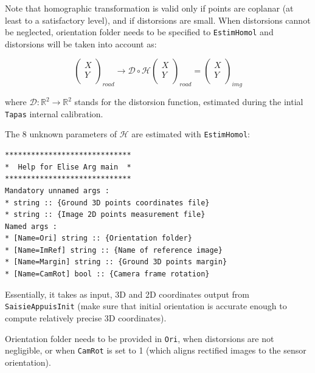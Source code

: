 \noindent Note that homographic transformation is valid only if points are coplanar (at least to a satisfactory level), and if distorsions are small. When distorsions cannot be neglected, orientation folder needs to be specified to \texttt{EstimHomol} and distorsions will be taken into account as: \newline

$$\left(
\begin{array}{c}
X\\
Y\\
\end{array}
\right)_{road} \rightarrow \mathcal{D} \circ \mathcal{H}\left(\begin{array}{c}
X\\
Y\\
\end{array}\right)_{road} = \left(\begin{array}{c}
X\\
Y\\
\end{array}\right)_{img}$$ \newline

\noindent where $\mathcal{D} : \mathbb{R}^2 \rightarrow \mathbb{R}^2$ stands for the distorsion function, estimated during the intial \texttt{Tapas} internal calibration. \newline

\noindent The 8 unknown parameters of $\mathcal{H}$ are estimated with \texttt{EstimHomol}: \newline

\begin{verbatim}
*****************************
*  Help for Elise Arg main  *
*****************************
Mandatory unnamed args : 
* string :: {Ground 3D points coordinates file}
* string :: {Image 2D points measurement file}
Named args : 
* [Name=Ori] string :: {Orientation folder}
* [Name=ImRef] string :: {Name of reference image}
* [Name=Margin] string :: {Ground 3D points margin}
* [Name=CamRot] bool :: {Camera frame rotation}
\end{verbatim}

\noindent Essentially, it takes as input, 3D and 2D coordinates output from \texttt{SaisieAppuisInit} (make sure that initial orientation is accurate enough to compute relatively precise 3D coordinates). \newline

\noindent Orientation folder needs to be provided in \texttt{Ori}, when distorsions are not negligible, or when \texttt{CamRot} is set to 1 (which aligns rectified images to the sensor orientation). \newline

